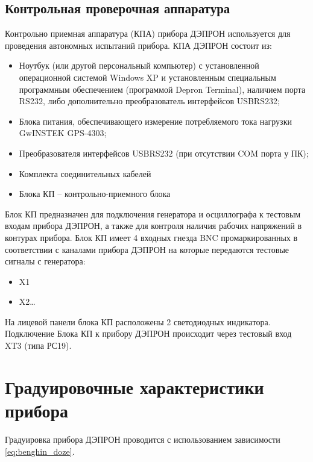 


\subsection{Контрольная проверочная аппаратура}

Контрольно приемная аппаратура (КПА) прибора ДЭПРОН используется для  проведения автономных испытаний прибора. КПА ДЭПРОН состоит из:


\begin{itemize}
	\item 	Ноутбук (или другой персональный компьютер) с установленной операционной системой Windows XP и установленным специальным программным обеспечением (программой Depron Terminal), наличием порта RS232, либо дополнительно преобразователь интерфейсов USBRS232;
	
	
	\item 	Блока питания, обеспечивающего измерение потребляемого тока нагрузки GwINSTEK GPS-4303;
	
	
	\item 	Преобразователя интерфейсов USBRS232 (при отсутствии COM порта у ПК);
	
	
	\item 	Комплекта соединительных кабелей 
	
	
	\item 	Блока КП -- контрольно-приемного блока
	
	
\end{itemize}








Блок КП предназначен для подключения генератора и осциллографа к тестовым входам прибора ДЭПРОН, а также для контроля наличия рабочих напряжений в контурах прибора. Блок КП имеет 4 входных гнезда BNC промаркированных в соответствии с каналами прибора ДЭПРОН на которые передаются тестовые сигналы с генератора: 



\begin{itemize}
	
	\item 	X1	
	
	\item 	X2\ldots
		
\end{itemize}

На лицевой панели блока КП расположены 2 светодиодных индикатора. Подключение Блока КП к прибору ДЭПРОН происходит через тестовый вход XT3 (типа РС19).


\section{Градуировочные  характеристики прибора}
Градуировка прибора ДЭПРОН проводится с использованием зависимости \ref{eq:benghin_doze}. 
